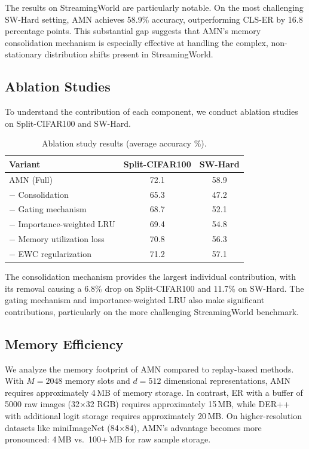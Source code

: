 \documentclass[11pt]{article}
\begin{document}
The results on StreamingWorld are particularly notable. On the most challenging SW-Hard setting, AMN achieves 58.9\% accuracy, outperforming CLS-ER by 16.8 percentage points. This substantial gap suggests that AMN's memory consolidation mechanism is especially effective at handling the complex, non-stationary distribution shifts present in StreamingWorld.

\subsection{Ablation Studies}

To understand the contribution of each component, we conduct ablation studies on Split-CIFAR100 and SW-Hard.

\begin{table}[h]
\centering
\caption{Ablation study results (average accuracy \%).}
\label{tab:ablation}
\begin{tabular}{@{}lcc@{}}
\toprule
Variant & Split-CIFAR100 & SW-Hard \\
\midrule
AMN (Full) & 72.1 & 58.9 \\
$-$ Consolidation & 65.3 & 47.2 \\
$-$ Gating mechanism & 68.7 & 52.1 \\
$-$ Importance-weighted LRU & 69.4 & 54.8 \\
$-$ Memory utilization loss & 70.8 & 56.3 \\
$-$ EWC regularization & 71.2 & 57.1 \\
\bottomrule
\end{tabular}
\end{table}

The consolidation mechanism provides the largest individual contribution, with its removal causing a 6.8\% drop on Split-CIFAR100 and 11.7\% on SW-Hard. The gating mechanism and importance-weighted LRU also make significant contributions, particularly on the more challenging StreamingWorld benchmark.

\subsection{Memory Efficiency}

We analyze the memory footprint of AMN compared to replay-based methods. With $M = 2048$ memory slots and $d = 512$ dimensional representations, AMN requires approximately 4\,MB of memory storage. In contrast, ER with a buffer of 5000 raw images (32$\times$32 RGB) requires approximately 15\,MB, while DER++ with additional logit storage requires approximately 20\,MB. On higher-resolution datasets like miniImageNet (84$\times$84), AMN's advantage becomes more pronounced: 4\,MB vs.\ 100+\,MB for raw sample storage.
\end{document}
